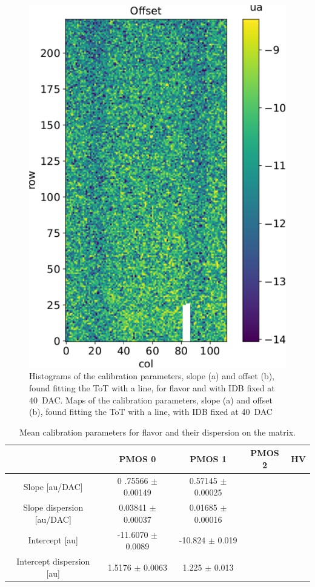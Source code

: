 \begin{figure}[h!]
            \includegraphics[width=.49\linewidth]{figures/charaterization/offset_map.pdf}
            \caption{Histograms of the calibration parameters, slope (a) and offset (b), found fitting the ToT with a line, for  flavor and with IDB fixed at \SI{40}{DAC}. Maps of the calibration parameters, slope (a) and offset (b), found fitting the ToT with a line, with IDB fixed at \SI{40}{DAC}}
            \label{fig:ToT_histograms_all_fl}
        \end{figure} 


        \begin{table}
            \begin{center}
            \begin{tabular}{| c |  c | c | c |c |}
            \hline
            & PMOS 0 & PMOS 1 & PMOS 2 & HV \\
            \hline
            \hline
            Slope [au/DAC] & 0 .75566 $\pm$ 0.00149 & 0.57145 $\pm$ 0.00025 \\
            Slope dispersion [au/DAC] & 0.03841 $\pm$ 0.00037 & 0.01685 $\pm$ 0.00016\\
            Intercept [au] & -11.6070 $\pm$ 0.0089 & -10.824 $\pm$ 0.019 \\
            Intercept dispersion [au] & 1.5176 $\pm$ 0.0063 & 1.225 $\pm$ 0.013\\
            \hline
            \end{tabular}
            \caption{Mean calibration parameters for  flavor and their dispersion on the matrix. }
            \label{tab:calibration_param}
            \end{center}
        \end{table}        


